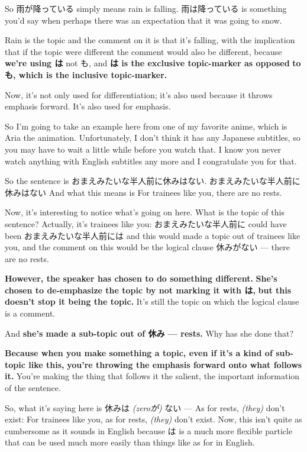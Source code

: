 So 雨が降っている simply means rain is falling. 雨は降っている is something you'd say when perhaps there was an expectation that it was going to snow.

{}

Rain is the topic and the comment on it is that it's falling, with the implication that if the topic were different the comment would also be different, because {\bf we're using は} not も, and {\bf は is the exclusive topic-marker as opposed} {\bf to も, which is the inclusive topic-marker.}

\thinrule

Now, it's not only used for differentiation; it's also used because it throws emphasis forward. It's also used for emphasis.

So I'm going to take an example here from one of my favorite anime, which is Aria the animation. Unfortunately, I don't think it has any Japanese subtitles, so you may have to wait a little while before you watch that. I know you never watch anything with English subtitles any more and I congratulate you for that.

So the sentence is おまえみたいな半人前に休みはない. おまえみたいな半人前に休みはない And what this means is For trainees like you, there are no rests.

Now, it's interesting to notice what's going on here. What is the topic of this sentence? Actually, it's trainees like you: おまえみたいな半人前に could have been おまえみたいな半人前には and this would made a topic out of trainees like you, and the comment on this would be the logical clause 休みがない --- there are no rests.

\thinrule

{\bf However, the speaker has chosen to do something different.} {\bf She's chosen to de-emphasize the topic by not marking it with は,} {\bf but this doesn't stop it being the topic.} It's still the topic on which the logical clause is a comment.

And {\bf she's made a sub-topic out of 休み --- rests.} Why has she done that?

{}

{\bf Because when you make something a topic, even if it's a kind of sub-topic like this,} {\bf you're throwing the emphasis forward onto what follows it.} You're making the thing that follows it the salient, the important information of the sentence.

So, what it's saying here is 休みは {\em (zeroが)} ない --- As for rests, {\em (they)} don't exist: For trainees like you, as for rests, {\em (they)} don't exist. Now, this isn't quite as cumbersome as it sounds in English because は is a much more flexible particle that can be used much more easily than things like as for in English.

